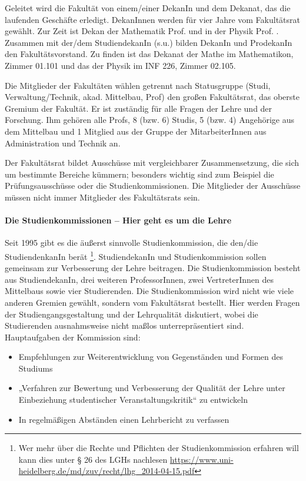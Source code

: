Geleitet wird die Fakultät von einem/einer DekanIn und dem Dekanat, das die laufenden Geschäfte erledigt. DekanInnen werden für vier Jahre vom Fakultätsrat gewählt. Zur Zeit ist Dekan der Mathematik Prof. \dekanmathe{} und in der Physik Prof. \dekanphysik. Zusammen mit der/dem StudiendekanIn (s.u.) bilden DekanIn und ProdekanIn den Fakultätsvorstand. Zu finden ist das Dekanat der Mathe im \Gls{Mathematikon}, Zimmer 01.101 und das der Physik im INF 226, Zimmer 02.105.

Die Mitglieder der Fakultäten wählen getrennt nach Statusgruppe (Studi, Verwaltung/Technik, akad. Mittelbau, Prof) den großen Fakultätsrat, das oberste Gremium der Fakultät. Er ist zuständig für alle Fragen der Lehre und der Forschung. Ihm gehören alle Profs, 8 (bzw. 6) Studis, 5 (bzw. 4) Angehörige aus dem Mittelbau und 1 Mitglied aus der Gruppe der MitarbeiterInnen aus Administration und Technik an.

Der Fakultätsrat bildet Ausschüsse mit vergleichbarer Zusammensetzung, die sich um bestimmte Bereiche kümmern; besonders wichtig sind zum Beispiel die Prüfungsausschüsse oder die Studienkommissionen. Die Mitglieder der Ausschüsse müssen nicht immer Mitglieder des Fakultätsrats sein.


\paragraph{Die Studienkommissionen -- Hier geht es um die Lehre}

Seit 1995 gibt es die äußerst sinnvolle Studienkommission, die den/die StudiendenkanIn berät \footnote{Wer mehr über die Rechte und Pflichten der Studienkommission erfahren will kann dies unter § 26 des LGHs nachlesen \url{https://www.uni-heidelberg.de/md/zuv/recht/lhg_2014-04-15.pdf}}. StudiendekanIn und Studienkommission sollen gemeinsam zur Verbesserung der Lehre beitragen. Die Studienkommission besteht aus StudiendekanIn, drei weiteren ProfessorInnen, zwei VertreterInnen des Mittelbaus sowie vier Studierenden. Die Studienkommission wird nicht wie viele anderen Gremien gewählt, sondern vom Fakultätsrat bestellt. Hier werden Fragen der Studiengangsgestaltung und der Lehrqualität diskutiert, wobei die Studierenden ausnahmsweise nicht maßlos unterrepräsentiert sind. Hauptaufgaben der Kommission sind:
\begin{itemize}
    \addtolength{\itemsep}{-0.7\baselineskip}
    \item Empfehlungen zur Weiterentwicklung von Gegenständen und Formen des Studiums
    \item „Verfahren zur Bewertung und Verbesserung der Qualität der Lehre unter
          Einbeziehung studentischer Veranstaltungskritik“ zu entwickeln
    \item In regelmäßigen Abständen einen Lehrbericht zu verfassen
\end{itemize}

